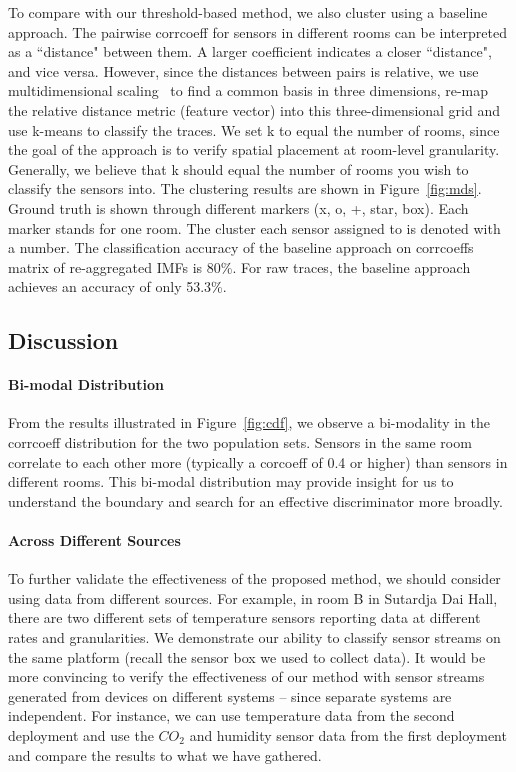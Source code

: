 To compare with our threshold-based method, we also cluster using a baseline approach. The pairwise corrcoeff for sensors in different rooms can be interpreted as a ``distance" between them.
A larger coefficient indicates a closer ``distance", and vice versa.  However, since the distances between pairs is relative, we use
multidimensional scaling~\cite{MDS} to find a common basis in three dimensions, re-map the relative distance metric (feature vector) into 
this three-dimensional grid and use k-means to classify the traces. %
We set k to equal the number of rooms, since the goal of the approach is to verify spatial placement at room-level granularity.  Generally, 
we believe that k should equal the number of rooms you wish to classify the sensors into. 
The clustering results are shown in Figure~\ref{fig:mds}.  Ground truth is shown through different markers (x, o, +, star, box). Each marker stands for one room. 
The cluster each sensor assigned to is denoted with a number. The classification accuracy of the baseline approach on corrcoeffs matrix of re-aggregated IMFs is 80\%. 
For raw traces, the baseline approach achieves an accuracy of only 53.3\%.

\subsection{Discussion}
\paragraph{Bi-modal Distribution} From the results illustrated in Figure~\ref{fig:cdf}, we observe a bi-modality in the corrcoeff 
distribution for the two population sets.  Sensors in the same room correlate to each other more (typically a corcoeff of 0.4 or higher)
than sensors in different rooms.  %
This bi-modal distribution may provide insight for us to 
understand the boundary and search for an effective discriminator more broadly.

\paragraph{Across Different Sources}
To further validate the effectiveness of the proposed method, we should consider using data from different sources.
For example, in room B in Sutardja Dai Hall, there are two different sets of temperature sensors reporting data at different rates and granularities.
We demonstrate our ability to classify sensor streams on the same platform (recall the sensor box we used to collect data). 
It would be more convincing to verify the effectiveness of our method with sensor streams generated from devices on
 different systems -- since separate systems are independent.  For instance, we can use temperature data from the second deployment 
 and use the $CO_{2}$ and humidity sensor data from the first deployment and compare the results to what we have gathered.

